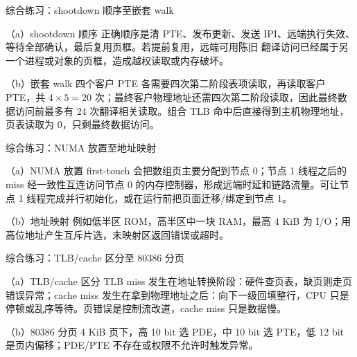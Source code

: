 \begin{chapteranswer}{综合练习：shootdown 顺序至嵌套 walk}
\begin{answersubproblem}{（a）shootdown 顺序}
正确顺序是清 PTE、发布更新、发送 IPI、远端执行失效、等待全部确认，最后复用页框。若提前复用，远端可用陈旧  翻译访问已经属于另一个进程或对象的页框，造成越权读取或内存破坏。
\end{answersubproblem}
\begin{answersubproblem}{（b）嵌套 walk}
四个客户 PTE 各需要四次第二阶段表项读取，再读取客户 PTE，共 $4\times5=20$ 次；最终客户物理地址还需四次第二阶段读取，因此最终数据访问前最多有 24 次翻译相关读取。组合 TLB 命中后直接得到主机物理地址，页表读取为 0，只剩最终数据访问。
\end{answersubproblem}
\end{chapteranswer}

\begin{chapteranswer}{综合练习：NUMA 放置至地址映射}
\begin{answersubproblem}{（a）NUMA 放置}
first-touch 会把数组页主要分配到节点 0；节点 1 线程之后的 miss 经一致性互连访问节点 0 的内存控制器，形成远端时延和链路流量。可让节点 1 线程完成并行初始化，或在运行前把页面迁移/绑定到节点 1。
\end{answersubproblem}
\begin{answersubproblem}{（b）地址映射}
例如低半区 ROM，高半区中一块 RAM，最高 4 KiB 为 I/O；用高位地址产生互斥片选，未映射区返回错误或超时。
\end{answersubproblem}
\end{chapteranswer}

\begin{chapteranswer}{综合练习：TLB/cache 区分至 80386 分页}
\begin{answersubproblem}{（a）TLB/cache 区分}
TLB miss 发生在地址转换阶段：硬件查页表，缺页则走页错误异常；cache miss 发生在拿到物理地址之后：向下一级回填整行，CPU 只是停顿或乱序等待。页错误是控制流改道，cache miss 只是数据慢。
\end{answersubproblem}
\begin{answersubproblem}{（b）80386 分页}
4 KiB 页下，高 10 bit 选 PDE，中 10 bit 选 PTE，低 12 bit 是页内偏移；PDE/PTE 不存在或权限不允许时触发异常。
\end{answersubproblem}
\end{chapteranswer}

